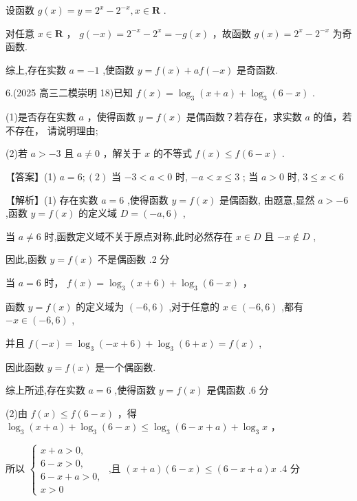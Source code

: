 \documentclass[10pt]{article}
\newcommand*\circled[1]{\tikz[baseline=(char.base)]{\node[shape=circle,draw,inner sep=1.5pt] (char) {\small #1};}}
\begin{document}
设函数 \(g\left( x\right)  = y = {2}^{x} - {2}^{-x},x \in  \mathbf{R}\) .

对任意 \(x \in  \mathbf{R}\) ， \(g\left( {-x}\right)  = {2}^{-x} - {2}^{x} =  - g\left( x\right)\) ，故函数 \(g\left( x\right)  = {2}^{x} - {2}^{-x}\) 为奇函数.

综上,存在实数 \(a =  - 1\) ,使函数 \(y = f\left( x\right)  + {af}\left( {-x}\right)\) 是奇函数.

6.(2025 高三二模崇明 18)已知 \(f\left( x\right)  = {\log }_{3}\left( {x + a}\right)  + {\log }_{3}\left( {6 - x}\right)\) .

(1)是否存在实数 \(a\) ，使得函数 \(y = f\left( x\right)\) 是偶函数？若存在，求实数 \(a\) 的值，若不存在， 请说明理由;

(2)若 \(a >  - 3\) 且 \(a \neq  0\) ，解关于 \(x\) 的不等式 \(f\left( x\right)  \leq  f\left( {6 - x}\right)\) .

【答案】(1) \(a = 6;\left( 2\right)\) 当 \(- 3 < a < 0\) 时, \(- a < x \leq  3\) ; 当 \(a > 0\) 时, \(3 \leq  x < 6\)

【解析】(1) 存在实数 \(a = 6\) ,使得函数 \(y = f\left( x\right)\) 是偶函数, 由题意,显然 \(a >  - 6\) ,函数 \(y = f\left( x\right)\) 的定义域 \(D = \left( {-a,6}\right)\) ,

当 \(a \neq  6\) 时,函数定义域不关于原点对称,此时必然存在 \(x \in  D\) 且 \(- x \notin  D\) ,

因此,函数 \(y = f\left( x\right)\) 不是偶函数 .2 分

当 \(a = 6\) 时， \(f\left( x\right)  = {\log }_{3}\left( {x + 6}\right)  + {\log }_{3}\left( {6 - x}\right)\) ，

函数 \(y = f\left( x\right)\) 的定义域为 \(\left( {-6,6}\right)\) ,对于任意的 \(x \in  \left( {-6,6}\right)\) ,都有 \(- x \in  \left( {-6,6}\right)\) ,

并且 \(f\left( {-x}\right)  = {\log }_{3}\left( {-x + 6}\right)  + {\log }_{3}\left( {6 + x}\right)  = f\left( x\right)\) ,

因此函数 \(y = f\left( x\right)\) 是一个偶函数.

综上所述,存在实数 \(a = 6\) ,使得函数 \(y = f\left( x\right)\) 是偶函数 .6 分

(2)由 \(f\left( x\right)  \leq  f\left( {6 - x}\right)\) ，得 \({\log }_{3}\left( {x + a}\right)  + {\log }_{3}\left( {6 - x}\right)  \leq  {\log }_{3}\left( {6 - x + a}\right)  + {\log }_{3}x\) ，

所以 \(\left\{  \begin{array}{l} x + a > 0, \\  6 - x > 0, \\  6 - x + a > 0, \\  x > 0 \end{array}\right.\) ,且 \(\left( {x + a}\right) \left( {6 - x}\right)  \leq  \left( {6 - x + a}\right) x\)  \circled{1}  .4 分
\end{document}
